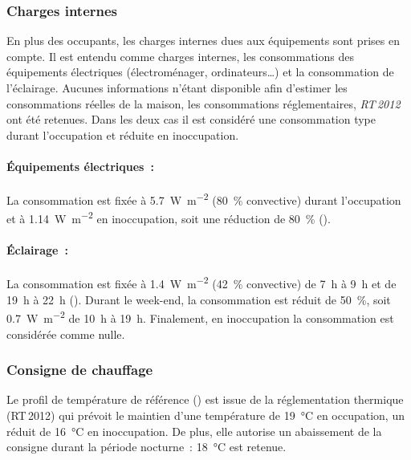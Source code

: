\subsubsection{Charges internes} %
\label{ssub:charges_internes}
En plus des occupants, les charges internes dues aux équipements sont prises en compte. Il
est entendu comme charges internes, les consommations des équipements électriques
(électroménager, ordinateurs\dots) et la consommation de l’éclairage. Aucunes informations
n’étant disponible afin d’estimer les consommations réelles de la maison, les
consommations réglementaires, \textit{RT\,2012} \parencite{CSTB2011} ont été retenues.
Dans les deux cas il est considéré une consommation type durant l’occupation
et réduite en inoccupation.

\paragraph{Équipements électriques~:} %
\label{par:equipements_electriques}
La consommation est fixée à \SI{5.7}{\watt\per m^{2}} (\SI{80}{\percent}
convective) durant l’occupation et à \SI{1.14}{\watt\per m^{2}} en inoccupation, soit une
réduction de \SI{80}{\percent} ().

\paragraph{Éclairage~:} %
\label{par:eclairage}
La consommation est fixée à \SI{1.4}{\watt\per m^{2}} (\SI{42}{\percent} convective) de
\SI{7}{\hour} à \SI{9}{\hour} et de \SI{19}{\hour} à \SI{22}{\hour}
(). Durant le week-end, la consommation est réduit de
\SI{50}{\percent}, soit \SI{0.7}{\watt\per m^{2}} de \SI{10}{\hour} à \SI{19}{\hour}.
Finalement, en inoccupation la consommation est considérée comme nulle.


\subsubsection{Consigne de chauffage} %
\label{ssub:consigne_de_chauffage}
Le profil de température de référence () est issue de la
réglementation thermique (RT\,2012) qui prévoit le maintien d’une température de
\SI{19}{\celsius} en occupation, un réduit de \SI{16}{\celsius} en inoccupation. De plus,
elle autorise un abaissement de la consigne durant la période nocturne~: \SI{18}{\celsius} est
retenue.

